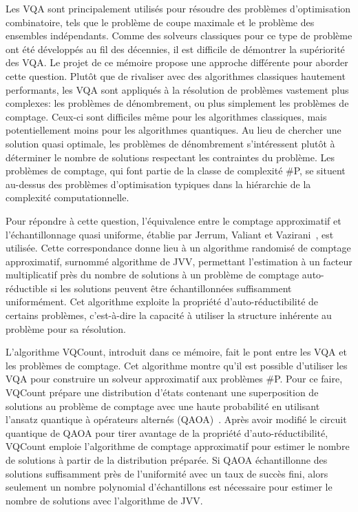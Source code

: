 Les VQA sont principalement utilisés pour résoudre des problèmes d'optimisation combinatoire, tels que le problème de coupe maximale et le problème des ensembles indépendants. Comme des solveurs classiques pour ce type de problème ont été développés au fil des décennies, il est difficile de démontrer la supériorité des VQA. Le projet de ce mémoire propose une approche différente pour aborder cette question. Plutôt que de rivaliser avec des algorithmes classiques hautement performants, les VQA sont appliqués à la résolution de problèmes vastement plus complexes: les problèmes de dénombrement, ou plus simplement les problèmes de comptage. Ceux-ci sont difficiles même pour les algorithmes classiques, mais potentiellement moins pour les algorithmes quantiques. Au lieu de chercher une solution quasi optimale, les problèmes de dénombrement s'intéressent plutôt à déterminer le nombre de solutions respectant les contraintes du problème. Les problèmes de comptage, qui font partie de la classe de complexité \textsf{\#P}, se situent au-dessus des problèmes d'optimisation typiques dans la hiérarchie de la complexité computationnelle.

Pour répondre à cette question, l'équivalence entre le comptage approximatif et l'échantillonnage quasi uniforme, établie par Jerrum, Valiant et Vazirani~\cite{jerrumRandomGenerationCombinatorial1986}, est utilisée. Cette correspondance donne lieu à un algorithme randomisé de comptage approximatif, surnommé algorithme de JVV, permettant l'estimation à un facteur multiplicatif près du nombre de solutions à un problème de comptage auto-réductible si les solutions peuvent être échantillonnées suffisamment uniformément. Cet algorithme exploite la propriété d'auto-réductibilité de certains problèmes, c'est-à-dire la capacité à utiliser la structure inhérente au problème pour sa résolution.

L'algorithme VQCount, introduit dans ce mémoire, fait le pont entre les VQA et les problèmes de comptage. Cet algorithme montre qu'il est possible d'utiliser les VQA pour construire un solveur approximatif aux problèmes \textsf{\#P}. Pour ce faire, VQCount prépare une distribution d'états contenant une superposition de solutions au problème de comptage avec une haute probabilité en utilisant l'ansatz quantique à opérateurs alternés (QAOA)~\cite{hadfieldQuantumApproximateOptimization2019}. Après avoir modifié le circuit quantique de QAOA pour tirer avantage de la propriété d'auto-réductibilité, VQCount emploie l'algorithme de comptage approximatif pour estimer le nombre de solutions à partir de la distribution préparée. Si QAOA échantillonne des solutions suffisamment près de l'uniformité avec un taux de succès fini, alors seulement un nombre polynomial d'échantillons est nécessaire pour estimer le nombre de solutions avec l'algorithme de JVV. 

